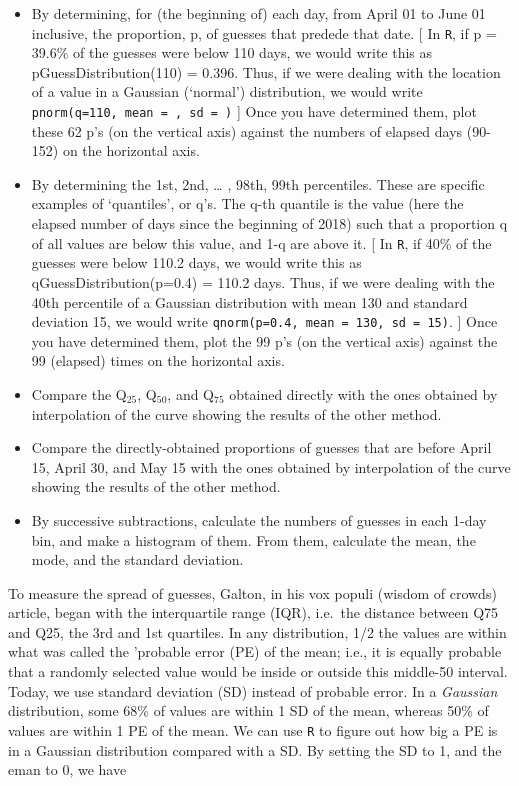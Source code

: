 \documentclass[]{book}
\begin{document}
\begin{itemize}
\item
  By determining, for (the beginning of) each day, from April 01 to June 01 inclusive, the proportion, p, of guesses that predede that date. {[} In \texttt{R}, if p = 39.6\% of the guesses were below 110 days, we would write this as pGuessDistribution(110) = 0.396. Thus, if we were dealing with the location of a value in a Gaussian (`normal') distribution, we would write \texttt{pnorm(q=110,\ mean\ =\ ,\ sd\ =\ )} {]} Once you have determined them, plot these 62 p's (on the vertical axis) against the numbers of elapsed days (90-152) on the horizontal axis.
\item
  By determining the 1st, 2nd, \ldots{} , 98th, 99th percentiles. These are specific examples of `quantiles', or q's. The q-th quantile is the value (here the elapsed number of days since the beginning of 2018) such that a proportion q of all values are below this value, and 1-q are above it. {[} In \texttt{R}, if 40\% of the guesses were below 110.2 days, we would write this as qGuessDistribution(p=0.4) = 110.2 days. Thus, if we were dealing with the 40th percentile of a Gaussian distribution with mean 130 and standard deviation 15, we would write \texttt{qnorm(p=0.4,\ mean\ =\ 130,\ sd\ =\ 15)}. {]} Once you have determined them, plot the 99 p's (on the vertical axis) against the 99 (elapsed) times on the horizontal axis.
\item
  Compare the Q\(_{25}\), Q\(_{50}\), and Q\(_{75}\) obtained directly with the ones obtained by interpolation of the curve showing the results of the other method.
\item
  Compare the directly-obtained proportions of guesses that are before April 15, April 30, and May 15 with the ones obtained by interpolation of the curve showing the results of the other method.
\item
  By successive subtractions, calculate the numbers of guesses in each 1-day bin, and make a histogram of them. From them, calculate the mean, the mode, and the standard deviation.
\end{itemize}

To measure the spread of guesses, Galton, in his vox populi (wisdom of crowds) article, began with the interquartile range (IQR), i.e.~the distance between Q75 and Q25, the 3rd and 1st quartiles. In any distribution, 1/2 the values are within what was called the 'probable error (PE) of the mean; i.e., it is equally probable that a randomly selected value would be inside or outside this middle-50 interval. Today, we use standard deviation (SD) instead of probable error. In a \emph{Gaussian} distribution, some 68\% of values are within 1 SD of the mean, whereas 50\% of values are within 1 PE of the mean. We can use \texttt{R} to figure out how big a PE is in a Gaussian distribution compared with a SD. By setting the SD to 1, and the eman to 0, we have
\end{document}
